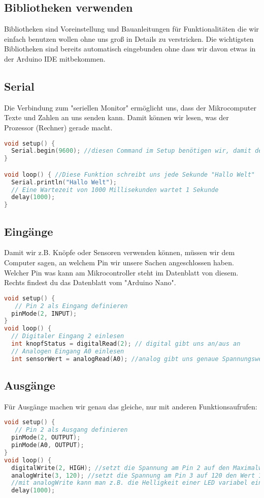 \subsection{\large{Bibliotheken verwenden}}
Bibliotheken sind Voreinstellung und Bauanleitungen für Funktionalitäten die wir einfach benutzen wollen ohne uns groß in Details zu verstricken. Die wichtigsten Bibliotheken sind bereits automatisch eingebunden ohne dass wir davon etwas in der Arduino IDE mitbekommen.
\subsection{Serial}
Die Verbindung zum "seriellen Monitor" ermöglicht uns, dass der Mikrocomputer Texte und Zahlen an uns senden kann. Damit können wir lesen, was der Prozessor (Rechner) gerade macht. 
\begin{lstlisting}[language=c, caption=Ausgabe von Text an den Programmierer]
void setup() {
  Serial.begin(9600); //diesen Command im Setup benötigen wir, damit der Computer weiß, wie er mit uns reden soll
}

void loop() { //Diese Funktion schreibt uns jede Sekunde "Hallo Welt"
  Serial.println("Hallo Welt");
  // Eine Wartezeit von 1000 Millisekunden wartet 1 Sekunde    
  delay(1000);        
}
\end{lstlisting}
\newpage
\subsection{\large{Eingänge}}
Damit wir z.B. Knöpfe oder Sensoren verwenden können, müssen wir dem Computer sagen, an welchem Pin wir unsere Sachen angeschlossen haben. Welcher Pin was kann am Mikrocontroller steht im Datenblatt von diesem. Rechts findest du das Datenblatt vom "Arduino Nano".
\begin{lstlisting}[language=c, caption=Eingänge am Arduino lesen]
void setup() {
   // Pin 2 als Eingang definieren
  pinMode(2, INPUT); 
}
void loop() {
  // Digitaler Eingang 2 einlesen
  int knopfStatus = digitalRead(2); // digital gibt uns an/aus an
  // Analogen Eingang A0 einlesen
  int sensorWert = analogRead(A0); //analog gibt uns genaue Spannungswerte am jeweiligen Pin an
\end{lstlisting}
\hfill \break \hfill \break \hfill \break \hfill \break \hfill \break \hfill \break \hfill \break \hfill \break \hfill \break \hfill \break \hfill \break \hfill \break \hfill \break \hfill \break \hfill \break
\subsection{\large{Ausgänge}}
Für Ausgänge machen wir genau das gleiche, nur mit anderen Funktionsaufrufen:
\begin{lstlisting}[language=c, caption=Ausgänge am Arduino nutzen]
void setup() {
   // Pin 2 als Ausgang definieren
  pinMode(2, OUTPUT); 
  pinMode(A0, OUTPUT);
}
void loop() {
  digitalWrite(2, HIGH); //setzt die Spannung am Pin 2 auf den Maximalwert
  analogWrite(3, 120); //setzt die Spannung am Pin 3 auf 120 den Wert 120 (Maximal gehen 255)
  //mit analogWrite kann man z.B. die Helligkeit einer LED variabel einstellen, wenn die LED das erlaubt
  delay(1000);
\end{lstlisting}
